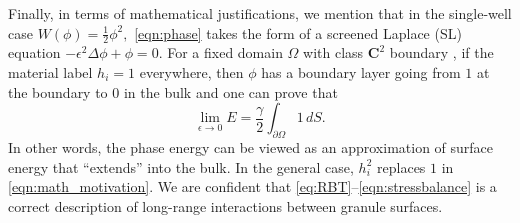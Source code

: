 Finally, in terms of mathematical justifications, we mention
that in the single-well case
$W(\phi) = \tfrac{1}{2}\phi^2,$ \eqref{eqn:phase} takes the form
of a screened Laplace (SL) equation $-\epsilon^2 \Delta \phi + \phi =0$.
For a fixed domain $\Omega$ with class $\mathbf{C}^2$ boundary \cite{},
if the material label $h_i = 1$ everywhere, then $\phi$
has a boundary layer going from $1$ at the boundary to $0$ in the bulk
and one can prove that 
\begin{equation}
\label{eqn:math_motivation}
\lim_{\epsilon \to 0} E = \frac{\gamma}{2} \int_{\partial \Omega} 1 \,dS.
\end{equation}
In other words, the phase energy can be viewed as an
approximation of surface energy that ``extends'' into the bulk.
In the general case, $h_i^2$ replaces $1$ in \eqref{eqn:math_motivation}.
We are confident that \eqref{eq:RBT}--\eqref{eqn:stressbalance}
is a correct description of long-range interactions between granule
surfaces.

